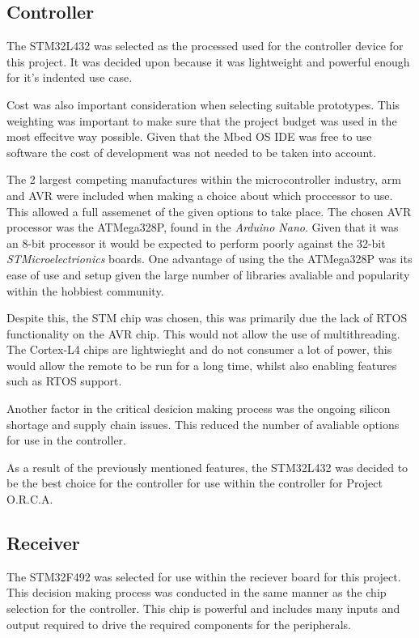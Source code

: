 \documentclass [11pt]{article}
\begin{document}
\subsection{Controller}

The STM32L432 was selected as the processed used for the controller device for this project. It was decided upon because it was lightweight and powerful enough for it's indented use case. 
 
Cost was also important consideration when selecting suitable prototypes. This weighting was important to make sure that the project budget was used in the most effecitve way possible. Given that the Mbed OS IDE was free to use software the cost of development was not needed to be taken into account. 

The 2 largest competing manufactures within the microcontroller industry, \gls{arm} and AVR were included when making a choice about which proccessor to use. This allowed a full assemenet of the given options to take place. The chosen AVR processor was the ATMega328P, found in the \textit{Arduino Nano}. Given that it was an 8-bit processor it would be expected to perform poorly against the 32-bit \textit{STMicroelectrionics} boards. One advantage of using the the ATMega328P was its ease of use and setup given the large number of libraries avaliable and popularity within the hobbiest community. 

Despite this, the STM chip was chosen, this was primarily due the lack of RTOS functionality on the AVR chip. This would not allow the use of multithreading. The Cortex-L4 chips are lightwieght and do not consumer a lot of power, this would allow the remote to be run for a long time, whilst also enabling features such as RTOS support. 

Another factor in the critical desicion making process was the ongoing silicon shortage and supply chain issues. This reduced the number of avaliable options for use in the controller.  

As a result of the previously mentioned features, the STM32L432 was decided to be the best choice for the controller for use within the controller for Project O.R.C.A.    

\subsection{Receiver}

The STM32F492 was selected for use within the reciever board for this project. This decision making process was conducted in the same manner as the chip selection for the controller. This chip is powerful and includes many inputs and output required to drive the required components for the peripherals.
\end{document}

